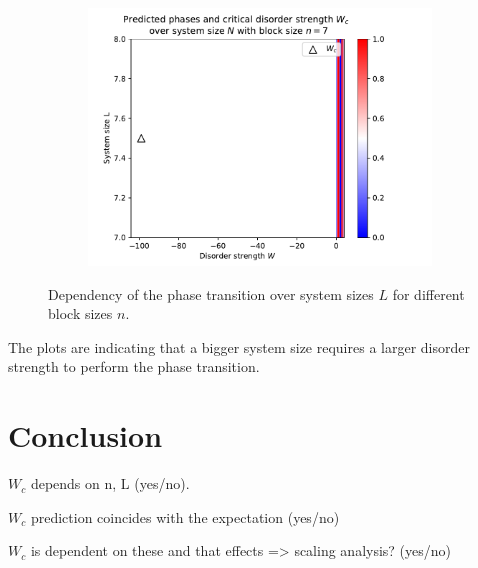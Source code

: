 \documentclass[reprint,amsmath,amssymb,aps,prb]{revtex4-2}
\begin{document}
\begin{center}
\begin{figure}[H]
\begin{subfigure}[c]{0.4\textwidth}
			\includegraphics[width=\textwidth]{../results/Wc/n7_Wc_N_dependency.pdf}
		\end{subfigure}
		\caption{Dependency of the phase transition over system sizes $L$ for different block sizes $n$.}
		\label{fig:wcextract}
	\end{figure}
\end{center}
\twocolumngrid%


The plots are indicating that a bigger system size requires a larger disorder strength to perform the phase transition.


\section{Conclusion}%

$W_c$ depends on n, L (yes/no).

$W_c$ prediction coincides with the expectation (yes/no)

$W_c$ is dependent on these and that effects => scaling analysis? (yes/no)

\lipsum[2]%



\newpage
\appendix
\end{document}
